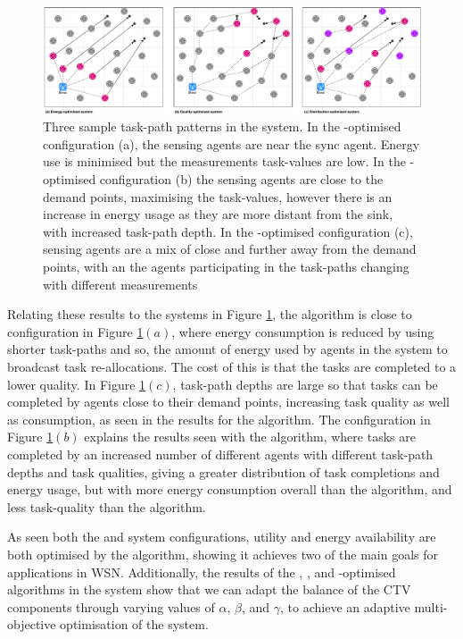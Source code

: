 \begin{figure}
	\centering
	\includegraphics[width=1.0\linewidth]{result-types}
	\caption{Three sample task-path patterns in the \simulationExtended{}{} system. In the \algorithmEnergy{}{}-optimised configuration (a), the sensing agents are near the sync agent. Energy use is minimised but the measurements task-values are low. In the \algorithmQuality{}{}-optimised configuration (b) the sensing agents are close to the demand points, maximising the task-values, however there is an increase in energy usage as they are more distant from the sink, with increased task-path depth. In the \algorithmDistribution{}{}-optimised configuration (c), sensing agents are a mix of close and further away from the demand points, with an the agents participating in the task-paths changing with different measurements}
	\label{fig:result-types}
\end{figure} 

Relating these results to the systems in Figure \ref{fig:result-types}, the \algorithmEnergy{}{} algorithm is close to configuration in Figure \ref{fig:result-types}$(a)$, where energy consumption is reduced by using shorter task-paths and so, the amount of energy used by agents in the system to broadcast task re-allocations. The cost of this is that the tasks are completed to a lower quality. In Figure \ref{fig:result-types}$(c)$, task-path depths are large so that tasks can be completed by agents close to their demand points, increasing task quality as well as consumption, as seen in the results for the \algorithmQuality{}{} algorithm. The configuration in Figure \ref{fig:result-types}$(b)$ explains the results seen with the \algorithmDistribution{}{} algorithm, where tasks are completed by an increased number of different agents with different task-path depths and task qualities, giving a greater distribution of task completions and energy usage, but with more energy consumption overall than the \algorithmEnergy{}{} algorithm, and less task-quality than the \algorithmQuality{}{} algorithm.

As seen both the \simulationSimple{}{} and \simulationExtended{}{} system configurations, utility and energy availability are both optimised by the algorithm, showing it achieves two of the main goals for applications in WSN. Additionally, the results of the \algorithmEnergy{}{}, \algorithmQuality{}{}, and \algorithmDistribution{}{}-optimised algorithms in the \simulationExtended{}{} system show that we can adapt the balance of the CTV components through varying values of $\alpha$, $\beta$, and $\gamma$, to achieve an adaptive multi-objective optimisation of the system.
